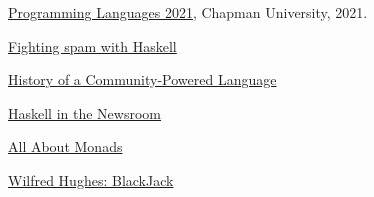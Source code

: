 \documentclass{article}
\begin{document}
\begin{thebibliography}{99}
\href{https://github.com/alexhkurz/programming-languages-2021/blob/main/README.md}{Programming Languages 2021}, Chapman University, 2021.

\href{https://engineering.fb.com/2015/06/26/security/fighting-spam-with-haskell/}{Fighting spam with Haskell}

\href{https://serokell.io/blog/haskell-history}{History of a Community-Powered Language}

{\href{https://www.infoq.com/presentations/haskell-newsroom-nyt/}{Haskell in the Newsroom}}

\href{https://wiki.haskell.org/All_About_Monads}{All About Monads}

\href{https://github.com/Wilfred/Blackjack/blob/master/Blackjack.hs}{
Wilfred Hughes: BlackJack}

\end{thebibliography}
\end{document}
